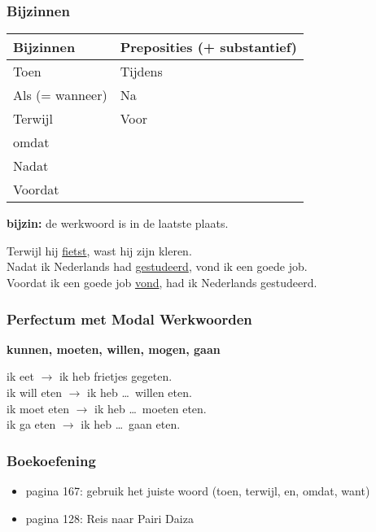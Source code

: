 \documentclass[usenames,dvipsnames]{beamer}
\begin{document}
	\begin{frame}
		\frametitle{Bijzinnen}

		\begin{center}
			\begin{tabular}{l l}
				\textbf{Bijzinnen} & \textbf{Preposities (+ substantief)} \\
				\hline

				Toen 								& Tijdens \\
				Als (= wanneer) 		& Na \\
				Terwijl 						& Voor \\
				omdat 							& \\
				Nadat 							& \\
				Voordat 						& \\

			\end{tabular}
		\end{center}

		\hfill \break

		\textbf{bijzin:} de werkwoord is in de laatste plaats. \break

		Terwijl hij \underline{fietst}, wast hij zijn kleren. \\
		Nadat ik Nederlands had \underline{gestudeerd}, vond ik een goede job. \\
		Voordat ik een goede job \underline{vond}, had ik Nederlands gestudeerd. \\
	\end{frame}


	\begin{frame}
		\frametitle{Perfectum met Modal Werkwoorden}

		\textbf{kunnen, moeten, willen, mogen, gaan} \break
		\hfill \break

		ik eet $\rightarrow$ ik heb frietjes gegeten. \\
		ik will eten $\rightarrow$ ik heb \ldots\ willen eten. \\
		ik moet eten $\rightarrow$ ik heb \ldots\ moeten eten. \\
		ik ga eten $\rightarrow$ ik heb \ldots\ gaan eten. \\

	\end{frame}


	\begin{frame}
		\frametitle{Boekoefening}

		\begin{itemize}
			\item pagina 167: gebruik het juiste woord (toen, terwijl, en, omdat, want)
			\item pagina 128: Reis naar Pairi Daiza
		\end{itemize}

	\end{frame}
\end{document}
